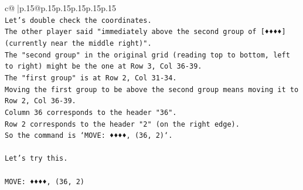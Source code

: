 \documentclass{article}
\begin{document}
{\begin{supertabular}{c@{$\;$}|p{.15\linewidth}@{}p{.15\linewidth}p{.15\linewidth}p{.15\linewidth}p{.15\linewidth}p{.15\linewidth}}
{{{\\ 
\texttt{Let's double check the coordinates.} \\
\texttt{The other player said "immediately above the second group of {[}♦♦♦♦{]} (currently near the middle right)".} \\
\texttt{The "second group" in the original grid (reading top to bottom, left to right) might be the one at Row 3, Col 36{-}39.} \\
\texttt{The "first group" is at Row 2, Col 31{-}34.} \\
\texttt{Moving the first group to be above the second group means moving it to Row 2, Col 36{-}39.} \\
\texttt{Column 36 corresponds to the header "36".} \\
\texttt{Row 2 corresponds to the header "2" (on the right edge).} \\
\texttt{So the command is `MOVE: ♦♦♦♦, (36, 2)`.} \\
\\ 
\texttt{Let's try this.} \\
\\ 
\texttt{MOVE: ♦♦♦♦, (36, 2)} \\
            }
        }
    }
     \\ \\


\end{supertabular}}
\end{document}
